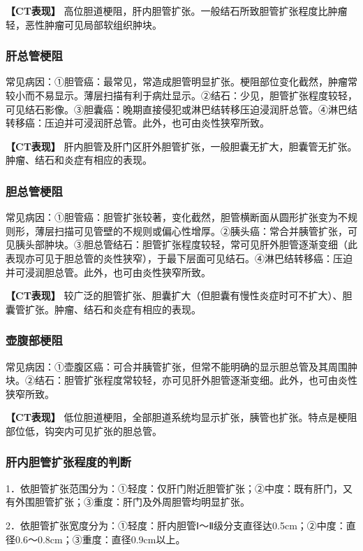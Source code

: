 \textbf{【CT表现】}
高位胆道梗阻，肝内胆管扩张。一般结石所致胆管扩张程度比肿瘤轻，恶性肿瘤可见局部软组织肿块。

\subsubsection{肝总管梗阻}

常见病因：①胆管癌：最常见，常造成胆管明显扩张。梗阻部位变化截然，肿瘤常较小而不易显示。薄层扫描有利于病灶显示。②结石：少见，胆管扩张程度较轻，可见结石影像。③胆囊癌：晚期直接侵犯或淋巴结转移压迫浸润肝总管。④淋巴结转移癌：压迫并可浸润肝总管。此外，也可由炎性狭窄所致。

\textbf{【CT表现】}
肝内胆管及肝门区肝外胆管扩张，一般胆囊无扩大，胆囊管无扩张。肿瘤、结石和炎症有相应的表现。

\subsubsection{胆总管梗阻}

常见病因：①胆管癌：胆管扩张较著，变化截然，胆管横断面从圆形扩张变为不规则形，薄层扫描可见管壁的不规则或偏心性增厚。②胰头癌：常合并胰管扩张，可见胰头部肿块。③胆总管结石：胆管扩张程度较轻，常可见肝外胆管逐渐变细（此表现亦可见于胆总管的炎性狭窄），于最下层面可见结石。④淋巴结转移癌：压迫并可浸润胆总管。此外，也可由炎性狭窄所致。

\textbf{【CT表现】}
较广泛的胆管扩张、胆囊扩大（但胆囊有慢性炎症时可不扩大）、胆囊管扩张。肿瘤、结石和炎症有相应的表现。

\subsubsection{壶腹部梗阻}

常见病因：①壶腹区癌：可合并胰管扩张，但常不能明确的显示胆总管及其周围肿块。②结石：胆管扩张程度常较轻，亦可见肝外胆管逐渐变细。此外，也可由炎性狭窄所致。

\textbf{【CT表现】}
低位胆道梗阻，全部胆道系统均显示扩张，胰管也扩张。特点是梗阻部位低，钩突内可见扩张的胆总管。

\subsubsection{肝内胆管扩张程度的判断}

1．依胆管扩张范围分为：①轻度：仅肝门附近胆管扩张；②中度：既有肝门，又有外围胆管扩张；③重度：肝门及外周胆管均明显扩张。

2．依胆管扩张宽度分为：①轻度：肝内胆管Ⅰ～Ⅱ级分支直径达0.5cm；②中度：直径0.6～0.8cm；③重度：直径0.9cm以上。

\protect\hypertarget{text00020.html}{}{}

